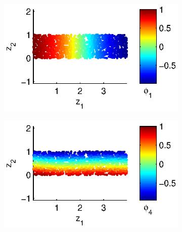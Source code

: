 \documentclass[preprint]{elsarticle}
\begin{document}
\begin{figure}[t]
\begin{subfigure}{0.5\textwidth}
\includegraphics[width=\textwidth]{strip_discrete1}
\end{subfigure}
\begin{subfigure}{0.5\textwidth}
\includegraphics[width=\textwidth]{strip_discrete4}
\end{subfigure}


\end{figure}
\end{document}
